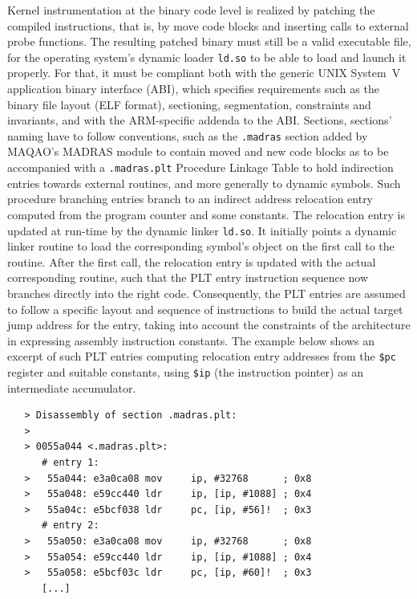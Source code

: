 \documentclass[11pt, a4paper, twoside]{montblanc2}
\begin{document}
Kernel instrumentation at the binary code level is realized by patching the 
compiled instructions, that is, by move code blocks and inserting calls to 
external probe functions. The resulting patched binary must still be a valid 
executable file, for the operating system's dynamic loader \verb|ld.so| to be 
able to load and launch it properly. For that, it must be compliant both with 
the generic UNIX System~V application binary interface (ABI), which specifies 
requirements such as the binary file layout (ELF format), sectioning, 
segmentation, constraints and invariants, and with the ARM-specific addenda to 
the ABI. Sections, sections' naming have to follow conventions, such as the 
\verb|.madras| section added by MAQAO's MADRAS module to contain moved and new 
code blocks as to be accompanied with a \verb|.madras.plt| Procedure Linkage 
Table to hold indirection entries towards external routines, and more generally 
to dynamic symbols. Such procedure branching entries branch to an indirect 
address relocation entry computed from the program counter and some constants. 
The relocation entry is updated at run-time by the dynamic linker \verb|ld.so|. 
It initially points a dynamic linker routine to load the corresponding symbol's 
object on the first call to the routine. After the first call, the relocation 
entry is updated with the actual corresponding routine, such that the PLT entry 
instruction sequence now branches directly into the right code. Consequently, 
the PLT entries
are assumed to follow a specific layout and sequence of instructions to build 
the actual target jump address for the entry, taking into account the 
constraints of the architecture in expressing assembly instruction constants. 
The example below shows an excerpt of such PLT entries computing relocation 
entry addresses from the \verb|$pc| register and suitable constants, using 
\verb|$ip| (the instruction pointer) as an intermediate accumulator.

\begin{footnotesize}
\begin{verbatim}
   > Disassembly of section .madras.plt:
   >
   > 0055a044 <.madras.plt>:
      # entry 1:
   >   55a044: e3a0ca08 mov     ip, #32768      ; 0x8
   >   55a048: e59cc440 ldr     ip, [ip, #1088] ; 0x4
   >   55a04c: e5bcf038 ldr     pc, [ip, #56]!  ; 0x3
      # entry 2:
   >   55a050: e3a0ca08 mov     ip, #32768      ; 0x8
   >   55a054: e59cc440 ldr     ip, [ip, #1088] ; 0x4
   >   55a058: e5bcf03c ldr     pc, [ip, #60]!  ; 0x3
      [...]
\end{verbatim}
\end{footnotesize}
\end{document}
